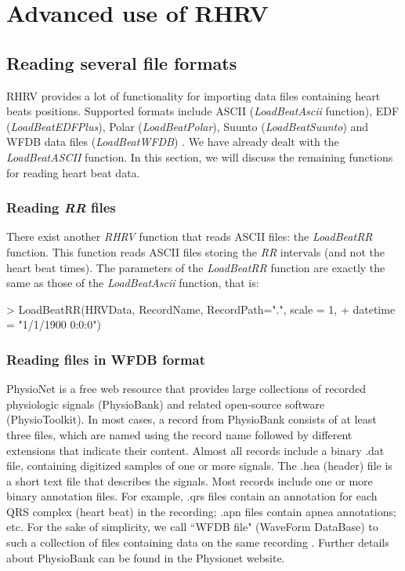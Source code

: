 \chapter{Advanced use of  RHRV\label{ch:RHRV}}

\section{Reading several file formats\label{sec:fileFormats}}
 RHRV provides a lot of functionality for importing data files containing heart 
beats positions. Supported formats include ASCII (\textit{LoadBeatAscii} 
function), EDF (\textit{LoadBeatEDFPlus}), Polar (\textit{LoadBeatPolar}), 
Suunto (\textit{LoadBeatSuunto}) and WFDB data files (\textit{LoadBeatWFDB}) 
\cite{mitbih}. We have already dealt with the \textit{LoadBeatASCII} function. 
In this section, we will discuss the remaining functions for reading heart beat 
data.

\subsection{Reading \textit{RR} files} There exist another \textit{RHRV} 
function that reads ASCII files:  the \textit{LoadBeatRR} function. This 
function reads ASCII files storing the \textit{RR} intervals (and not the heart 
beat times). The parameters of the \textit{LoadBeatRR} function are exactly the 
same as those of the \textit{LoadBeatAscii} function, that is:
\begin{Schunk}
\begin{Sinput}
> LoadBeatRR(HRVData, RecordName, RecordPath=".", scale = 1, 
+       datetime = "1/1/1900 0:0:0")
\end{Sinput}
\end{Schunk}
\subsection{Reading files in WFDB format} PhysioNet \cite{physioNet} is a free 
web resource that provides large collections of recorded physiologic signals 
(PhysioBank) and related open-source software (PhysioToolkit). In most cases, a 
record from PhysioBank consists of at least three files, which are named using 
the record name followed by different extensions that indicate their content. 
Almost all records include a binary .dat  file, containing digitized samples of 
one or more signals. The .hea (header) file is a short text file that describes 
the signals. Most records include one or more binary annotation files. For 
example, .qrs files contain an annotation for each QRS complex (heart beat) in 
the recording; .apn files contain apnea annotations; etc. For the sake of 
simplicity, we call ``WFDB file" (WaveForm DataBase) to such a collection of 
files containing data on the same recording \cite{mitbih}. Further details 
about PhysioBank can be found in the Physionet website. \\

